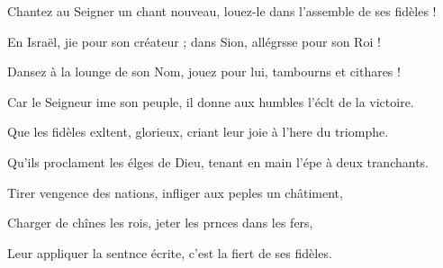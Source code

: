 \item Chantez au Seigner un chant nouveau,\psstar{} louez-le dans l’assemble de ses fidèles !
\item En Israël, jie pour son créateur ;\psstar{} dans Sion, allégrsse pour son Roi !
\item Dansez à la lounge de son Nom,\psstar{} jouez pour lui, tambourns et cithares !
\item Car le Seigneur ime son peuple,\psstar{} il donne aux humbles l’éclt de la victoire.
\item Que les fidèles exltent, glorieux,\psstar{} criant leur joie à l’here du triomphe.
\item Qu’ils proclament les élges de Dieu,\psstar{} tenant en main l’épe à deux tranchants.
\item Tirer vengence des nations,\psstar{} infliger aux peples un châtiment,
\item Charger de chînes les rois,\psstar{} jeter les prnces dans les fers,
\item Leur appliquer la sentnce écrite,\psstar{} c’est la fiert de ses fidèles.